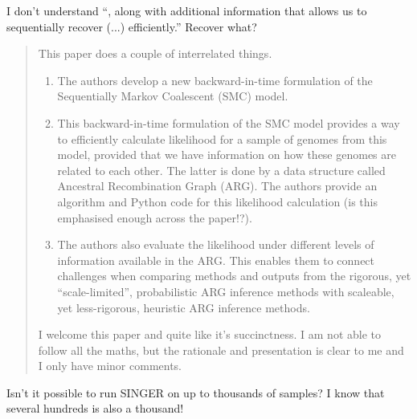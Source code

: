 \reply{
}

\begin{point}{\revref} %
 I don't understand ``, along with additional information that allows us to sequentially recover (...) efficiently.'' Recover what?
\end{point}




\begin{quote}
This paper does a couple of interrelated things.
\begin{enumerate}
    \item The authors develop a new backward-in-time formulation of the Sequentially Markov Coalescent (SMC) model.
    \item This backward-in-time formulation of the SMC model provides a way to efficiently calculate likelihood for a sample of genomes from this model, provided that we have information on how these genomes are related to each other. The latter is done by a data structure called Ancestral Recombination Graph (ARG). The authors provide an algorithm and Python code for this likelihood calculation (is this emphasised enough across the paper!?).
    \item The authors also evaluate the likelihood under different levels of information available in the ARG. This enables them to connect challenges when comparing methods and outputs from the rigorous, yet ``scale-limited'', probabilistic ARG inference methods with scaleable, yet less-rigorous, heuristic ARG inference methods.
\end{enumerate}
I welcome this paper and quite like it's succinctness. I am not able to follow all the maths, but the rationale and presentation is clear to me and I only have minor comments.
\end{quote}


\begin{point}{\revref} %
 Isn't it possible to run SINGER on up to thousands of samples? I know that several hundreds is also a thousand!
\end{point}


